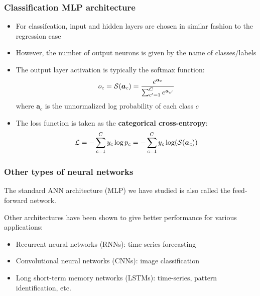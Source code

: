 \documentclass[smaller, handout]{beamer}
\begin{document}
\begin{frame}
  \frametitle{Classification MLP architecture}
  \pause
  \begin{itemize}
  \item For classifcation, input and hidden layers are chosen in similar fashion to the regression case

    \pause

  \item However, the number of output neurons is given by the name of classes/labels

  \item The output layer activation is typically the softmax function:
    \begin{equation}
     o_{c} =  \mathcal{S}(\bm a_{c}) = \frac{e^{\bm a_{c}}}{\sum_{c'=1}^{C}e^{\bm a_{c'}}}
    \end{equation}
    where $\bm a_{c}$ is the unnormalized log probability of each class $c$
    
    \pause
    
  \item The loss function is taken as the \textbf{categorical cross-entropy}:\pe
    \begin{equation}
      \mathcal{L} = -\sum_{c=1}^{C}y_{c}\log p_{c} = - \sum_{c=1}^{C}y_{c}\log(\mathcal{S}(\bm a_{c}) )   \end{equation}
  \end{itemize}
\end{frame}

\begin{frame}
  \frametitle{Other types of neural networks}
  \pause

  The standard ANN architecture (MLP) we have studied is also called the feed-forward network.

  \medskip
  
  Other architectures have been shown to give better performance for various applications: \pause

  \medskip
  \begin{itemize}[<+->]
  \item Recurrent neural networks (RNNs): time-series forecasting

  \item Convolutional neural networks (CNNs): image classification

  \item Long short-term memory networks (LSTMs): time-series, pattern identification, etc.
  \end{itemize}
  \pause
\end{frame}
\end{document}
